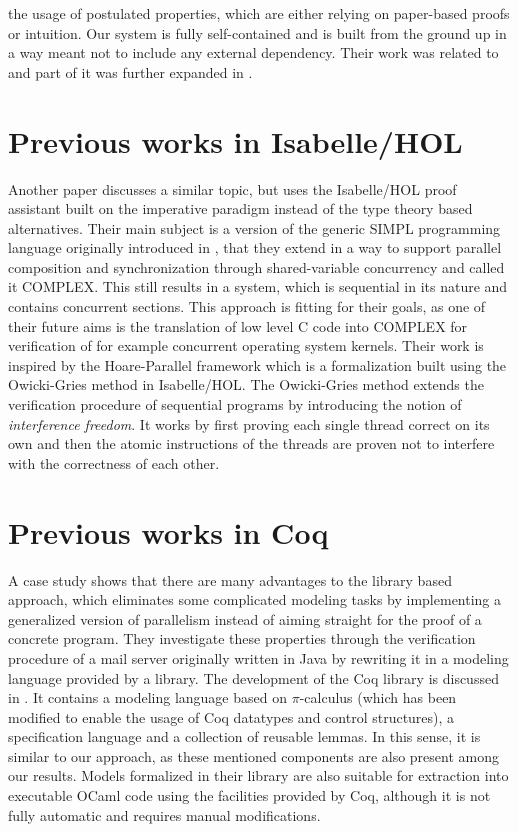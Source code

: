 the usage of postulated properties, which are either relying on paper-based proofs or intuition. Our system is fully self-contained and is built from the ground up in a way meant not to include any external dependency. Their work was related to and part of it was further expanded in \cite{Johan2018ProofCF}.

\section{Previous works in Isabelle/HOL}
Another paper\cite{Complx-Isabelle} discusses a similar topic, but uses the Isabelle/HOL proof assistant\cite{nipkow2002isabelle} built on the imperative paradigm instead of the type theory based alternatives. Their main subject is a version of the generic SIMPL programming language originally introduced in \cite{simpl-schirmer2006verification}, that they extend in a way to support parallel composition and synchronization through shared-variable concurrency and called it COMPLEX. This still results in a system, which is sequential in its nature and contains concurrent sections. This approach is fitting for their goals, as one of their future aims is the translation of low level C code into COMPLEX for verification of for example concurrent operating system kernels. Their work is inspired by the Hoare-Parallel framework\cite{hoare-parallel-nieto2002verification} which is a formalization built using the Owicki-Gries method\cite{owicki1976axiomatic} in Isabelle/HOL. The Owicki-Gries method extends the verification procedure of sequential programs by introducing the notion of \textit{interference freedom}. It works by first proving each single thread correct on its own and then the atomic instructions of the threads are proven not to interfere with the correctness of each other.

\section{Previous works in Coq}
A case study\cite{coq-concurrent-verification-case-study} shows that there are many advantages to the library based approach, which eliminates some complicated modeling tasks by implementing a generalized version of parallelism instead of aiming straight for the proof of a concrete program. They investigate these properties through the verification procedure of a mail server originally written in Java by rewriting it in a modeling language provided by a library. \cite{coq-mail-server} The development of the Coq library is discussed in \cite{AFFELDT200817}. It contains a modeling language based on $\pi$-calculus
\cite{MILNER19921}
\cite{MILNER199241}
\cite{sangiorgi2003pi}
(which has been modified to enable the usage of Coq datatypes and control structures), a specification language and a collection of reusable lemmas. In this sense, it is similar to our approach, as these mentioned components are also present among our results. Models formalized in their library are also suitable for extraction into executable OCaml code using the facilities provided by Coq, although it is not fully automatic and requires manual modifications.

